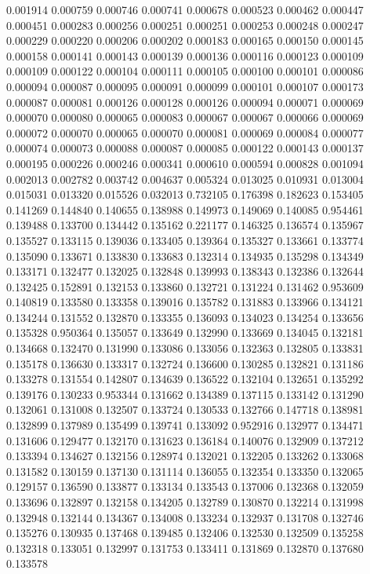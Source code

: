 0.001914
0.000759
0.000746
0.000741
0.000678
0.000523
0.000462
0.000447
0.000451
0.000283
0.000256
0.000251
0.000251
0.000253
0.000248
0.000247
0.000229
0.000220
0.000206
0.000202
0.000183
0.000165
0.000150
0.000145
0.000158
0.000141
0.000143
0.000139
0.000136
0.000116
0.000123
0.000109
0.000109
0.000122
0.000104
0.000111
0.000105
0.000100
0.000101
0.000086
0.000094
0.000087
0.000095
0.000091
0.000099
0.000101
0.000107
0.000173
0.000087
0.000081
0.000126
0.000128
0.000126
0.000094
0.000071
0.000069
0.000070
0.000080
0.000065
0.000083
0.000067
0.000067
0.000066
0.000069
0.000072
0.000070
0.000065
0.000070
0.000081
0.000069
0.000084
0.000077
0.000074
0.000073
0.000088
0.000087
0.000085
0.000122
0.000143
0.000137
0.000195
0.000226
0.000246
0.000341
0.000610
0.000594
0.000828
0.001094
0.002013
0.002782
0.003742
0.004637
0.005324
0.013025
0.010931
0.013004
0.015031
0.013320
0.015526
0.032013
0.732105
0.176398
0.182623
0.153405
0.141269
0.144840
0.140655
0.138988
0.149973
0.149069
0.140085
0.954461
0.139488
0.133700
0.134442
0.135162
0.221177
0.146325
0.136574
0.135967
0.135527
0.133115
0.139036
0.133405
0.139364
0.135327
0.133661
0.133774
0.135090
0.133671
0.133830
0.133683
0.132314
0.134935
0.135298
0.134349
0.133171
0.132477
0.132025
0.132848
0.139993
0.138343
0.132386
0.132644
0.132425
0.152891
0.132153
0.133860
0.132721
0.131224
0.131462
0.953609
0.140819
0.133580
0.133358
0.139016
0.135782
0.131883
0.133966
0.134121
0.134244
0.131552
0.132870
0.133355
0.136093
0.134023
0.134254
0.133656
0.135328
0.950364
0.135057
0.133649
0.132990
0.133669
0.134045
0.132181
0.134668
0.132470
0.131990
0.133086
0.133056
0.132363
0.132805
0.133831
0.135178
0.136630
0.133317
0.132724
0.136600
0.130285
0.132821
0.131186
0.133278
0.131554
0.142807
0.134639
0.136522
0.132104
0.132651
0.135292
0.139176
0.130233
0.953344
0.131662
0.134389
0.137115
0.133142
0.131290
0.132061
0.131008
0.132507
0.133724
0.130533
0.132766
0.147718
0.138981
0.132899
0.137989
0.135499
0.139741
0.133092
0.952916
0.132977
0.134471
0.131606
0.129477
0.132170
0.131623
0.136184
0.140076
0.132909
0.137212
0.133394
0.134627
0.132156
0.128974
0.132021
0.132205
0.133262
0.133068
0.131582
0.130159
0.137130
0.131114
0.136055
0.132354
0.133350
0.132065
0.129157
0.136590
0.133877
0.133134
0.133543
0.137006
0.132368
0.132059
0.133696
0.132897
0.132158
0.134205
0.132789
0.130870
0.132214
0.131998
0.132948
0.132144
0.134367
0.134008
0.133234
0.132937
0.131708
0.132746
0.135276
0.130935
0.137468
0.139485
0.132406
0.132530
0.132509
0.135258
0.132318
0.133051
0.132997
0.131753
0.133411
0.131869
0.132870
0.137680
0.133578
